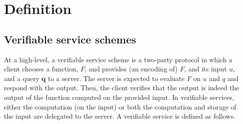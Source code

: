 
\section{Definition}\label{Definition}

\subsection{Verifiable service schemes}\label{subsec:VS}
At a high-level, a verifiable service scheme is a two-party protocol in which a client chooses a function, $F$, and provides (an encoding of) $F$, and its input $u$, and a query $\bm{q}$ to a server.  The server is expected to evaluate $F$ on $u$ and $q$ and respond with the output. Then, the client  verifies that the output is indeed the output of the function computed on the provided input. In verifiable services, either the computation (on the input) or both the computation and storage of the input are delegated to the server. A verifiable service is defined as follows. 


